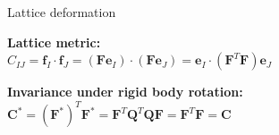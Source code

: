 \documentclass[10pt, aspectratio=169]{beamer}
\begin{document}
\begin{frame}{Lattice deformation}
\begin{flushleft}
        \vspace{0.4cm}
        \hspace{0.5cm} \textbf{\color{SecondaryTitle} \normalsize Lattice metric:}\\[0.15cm]
        \hspace{0.5cm} {\Large $\displaystyle C_{IJ} = \mathbf{f}_I \cdot \mathbf{f}_J = (\mathbf{F} \mathbf{e}_I) \cdot (\mathbf{F} \mathbf{e}_J) = \mathbf{e}_I \cdot (\mathbf{F}^T \mathbf{F}) \mathbf{e}_J$}
        
        \vspace{0.4cm}
        \hspace{0.5cm} \textbf{\color{SecondaryTitle} \normalsize Invariance under rigid body rotation:}\\[0.15cm]
        \hspace{0.5cm} {\Large $\displaystyle \mathbf{C}^* = (\mathbf{F}^*)^T \mathbf{F}^* = \mathbf{F}^T \mathbf{Q}^T \mathbf{Q} \mathbf{F} = \mathbf{F}^T \mathbf{F} = \mathbf{C}$}
    \end{flushleft}
    
\end{frame}
\end{document}
